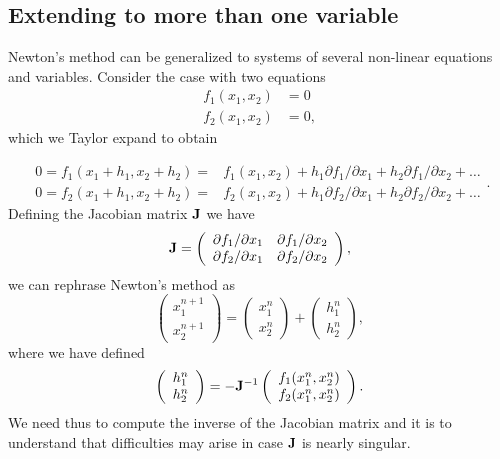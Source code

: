 \documentclass[%
oneside,                 %
final,                   %
10pt]{article}
\begin{document}
\subsection{Extending to more than one variable}

Newton's method can be generalized to systems of several non-linear equations
and variables. Consider the case with two equations
\[
   \begin{array}{cc} f_1(x_1,x_2) &=0\\
                     f_2(x_1,x_2) &=0,\end{array}
\]
which we Taylor expand to obtain

\[
   \begin{array}{cc} 0=f_1(x_1+h_1,x_2+h_2)=&f_1(x_1,x_2)+h_1
                     \partial f_1/\partial x_1+h_2
                     \partial f_1/\partial x_2+\dots\\
                     0=f_2(x_1+h_1,x_2+h_2)=&f_2(x_1,x_2)+h_1
                     \partial f_2/\partial x_1+h_2
                     \partial f_2/\partial x_2+\dots
                       \end{array}.
\]
Defining the Jacobian matrix ${\bf \bm{J}}$ we have
\[
 {\bf \bm{J}}=\left( \begin{array}{cc}
                         \partial f_1/\partial x_1  & \partial f_1/\partial x_2 \\
                          \partial f_2/\partial x_1     &\partial f_2/\partial x_2
             \end{array} \right),
\]
we can rephrase Newton's method as
\[
\left(\begin{array}{c} x_1^{n+1} \\ x_2^{n+1} \end{array} \right)=
\left(\begin{array}{c} x_1^{n} \\ x_2^{n} \end{array} \right)+
\left(\begin{array}{c} h_1^{n} \\ h_2^{n} \end{array} \right),
\]
where we have defined
\[
   \left(\begin{array}{c} h_1^{n} \\ h_2^{n} \end{array} \right)=
   -{\bf \bm{J}}^{-1}
   \left(\begin{array}{c} f_1(x_1^{n},x_2^{n}) \\ f_2(x_1^{n},x_2^{n}) \end{array} \right).
\]
We need thus to compute the inverse of the Jacobian matrix and it
is to understand that difficulties  may
arise in case ${\bf \bm{J}}$ is nearly singular.
\end{document}
